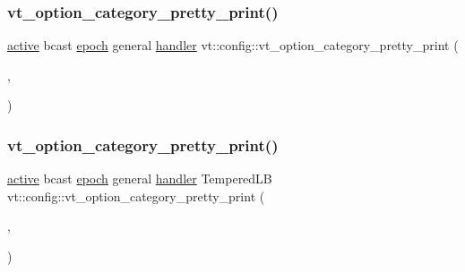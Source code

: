 \mbox{\label{namespacevt_1_1config_a6b3cbb09704f6c1c012567ed5a69ac45}} 
\subsubsection{\texorpdfstring{vt\+\_\+option\+\_\+category\+\_\+pretty\+\_\+print()}{vt\_option\_category\_pretty\_print()}\hspace{0.1cm}{\footnotesize\ttfamily [6/17]}}
{\footnotesize\ttfamily \hyperlink{namespacevt_1_1config_a6bd1d6215bda0d8ca02811798399f689a82f77c67af0c363709010c6df4dbd920}{active} bcast \hyperlink{namespacevt_1_1config_a6bd1d6215bda0d8ca02811798399f689a05bdb92281360bcbfdf239ad3ccbde19}{epoch} general \hyperlink{namespacevt_1_1config_a6bd1d6215bda0d8ca02811798399f689a82a0081a94d5c5dfd18b0b3f7eca64b7}{handler} vt\+::config\+::vt\+\_\+option\+\_\+category\+\_\+pretty\+\_\+print (\begin{DoxyParamCaption}\item[{\hyperlink{namespacevt_1_1config_a6bd1d6215bda0d8ca02811798399f689a130f5ad6dc3e35d09be7ee3581b07175}{hierlb}}]{,  }\item[{\char`\"{}Hierarchical\+LB\char`\"{}}]{ }\end{DoxyParamCaption})}

\mbox{\label{namespacevt_1_1config_a2431d1496b0d028ef88107ffa9f44243}} 
\subsubsection{\texorpdfstring{vt\+\_\+option\+\_\+category\+\_\+pretty\+\_\+print()}{vt\_option\_category\_pretty\_print()}\hspace{0.1cm}{\footnotesize\ttfamily [7/17]}}
{\footnotesize\ttfamily \hyperlink{namespacevt_1_1config_a6bd1d6215bda0d8ca02811798399f689a82f77c67af0c363709010c6df4dbd920}{active} bcast \hyperlink{namespacevt_1_1config_a6bd1d6215bda0d8ca02811798399f689a05bdb92281360bcbfdf239ad3ccbde19}{epoch} general \hyperlink{namespacevt_1_1config_a6bd1d6215bda0d8ca02811798399f689a82a0081a94d5c5dfd18b0b3f7eca64b7}{handler} Tempered\+LB vt\+::config\+::vt\+\_\+option\+\_\+category\+\_\+pretty\+\_\+print (\begin{DoxyParamCaption}\item[{\hyperlink{namespacevt_1_1config_a6bd1d6215bda0d8ca02811798399f689a52846d453b8bd4300e17a373cdf0cbdd}{temperedwmin}}]{,  }\item[{\char`\"{}Tempered\+W\+Min\char`\"{}}]{ }\end{DoxyParamCaption})}

